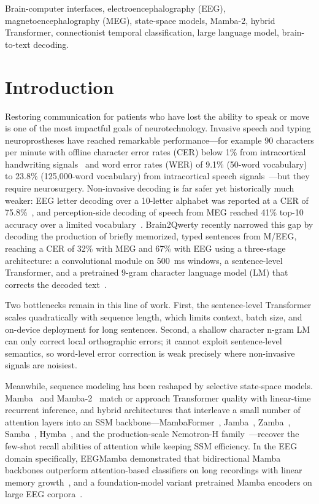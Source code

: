 \documentclass[conference]{IEEEtran}
\begin{document}
\begin{IEEEkeywords}
Brain-computer interfaces, electroencephalography (EEG),
magnetoencephalography (MEG), state-space models, Mamba-2, hybrid
Transformer, connectionist temporal classification, large language model,
brain-to-text decoding.
\end{IEEEkeywords}

\section{Introduction}
Restoring communication for patients who have lost the ability to speak or
move is one of the most impactful goals of neurotechnology. Invasive speech
and typing neuroprostheses have reached remarkable performance---for example
90 characters per minute with offline character error rates (CER) below 1\%
from intracortical handwriting signals~\cite{willett2021} and word error
rates (WER) of 9.1\% (50-word vocabulary) to 23.8\% (125,000-word
vocabulary) from intracortical speech signals~\cite{willett2023}---but they
require neurosurgery. Non-invasive decoding is far safer yet historically
much weaker: EEG letter decoding over a 10-letter alphabet was reported at a
CER of 75.8\%~\cite{crell2024}, and perception-side decoding of speech from
MEG reached 41\% top-10 accuracy over a limited
vocabulary~\cite{defossez2023}. Brain2Qwerty recently narrowed this gap by
decoding the production of briefly memorized, typed sentences from M/EEG,
reaching a CER of 32\% with MEG and 67\% with EEG using a three-stage
architecture: a convolutional module on 500~ms windows, a sentence-level
Transformer, and a pretrained 9-gram character language model (LM) that
corrects the decoded text~\cite{levy2025}.

Two bottlenecks remain in this line of work. First, the sentence-level
Transformer scales quadratically with sequence length, which limits context,
batch size, and on-device deployment for long sentences. Second, a shallow
character n-gram LM can only correct local orthographic errors; it cannot
exploit sentence-level semantics, so word-level error correction is weak
precisely where non-invasive signals are noisiest.

Meanwhile, sequence modeling has been reshaped by selective state-space
models. Mamba~\cite{gu2023mamba} and Mamba-2~\cite{dao2024ssd} match or
approach Transformer quality with linear-time recurrent inference, and
hybrid architectures that interleave a small number of attention layers into
an SSM backbone---MambaFormer~\cite{park2024mambaformer},
Jamba~\cite{lieber2024jamba}, Zamba~\cite{glorioso2024zamba},
Samba~\cite{ren2024samba}, Hymba~\cite{dong2024hymba}, and the
production-scale Nemotron-H family~\cite{nvidia2025nemotronh}---recover the
few-shot recall abilities of attention while keeping SSM efficiency. In the
EEG domain specifically, EEGMamba demonstrated that bidirectional Mamba
backbones outperform attention-based classifiers on long recordings with
linear memory growth~\cite{gui2024eegmamba}, and a foundation-model variant
pretrained Mamba encoders on large EEG corpora~\cite{wang2025eegmamba}.
\end{document}
